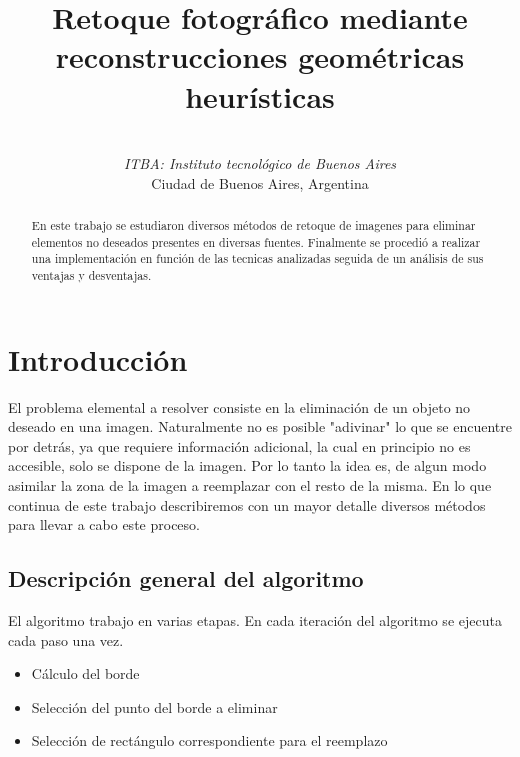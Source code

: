 \documentclass[conference]{IEEEtran}
\begin{document}
\title{Retoque fotográfico mediante reconstrucciones geométricas heurísticas}
\author{
 \\
\textit{ITBA: Instituto tecnológico de Buenos Aires}\\
Ciudad de Buenos Aires, Argentina
}
\maketitle

\begin{abstract}
En este trabajo se estudiaron
 diversos métodos de retoque de imagenes para eliminar elementos no deseados presentes en diversas fuentes. Finalmente se procedió a realizar una implementación en función de las tecnicas analizadas seguida de un análisis de sus ventajas y desventajas.
\end{abstract}

\section{Introducción}
El problema elemental a resolver consiste en la eliminación de un objeto no deseado en una imagen.
Naturalmente no es posible "adivinar" lo que se encuentre por detrás, ya que requiere información adicional, la cual en principio no es accesible, solo se dispone de la imagen. Por lo tanto la idea es, de algun modo asimilar la zona de la imagen a reemplazar con el resto de la misma. En lo que continua de este trabajo describiremos con un mayor detalle diversos métodos para llevar a cabo este proceso.

\subsection{Descripción general del algoritmo}
El algoritmo trabajo en varias etapas. En cada iteración del algoritmo se ejecuta cada paso una vez. 
\begin{itemize}
	\item Cálculo del borde
	\item Selección del punto del borde a eliminar
	\item Selección de rectángulo correspondiente para el reemplazo
	
\end{itemize}
\end{document}

